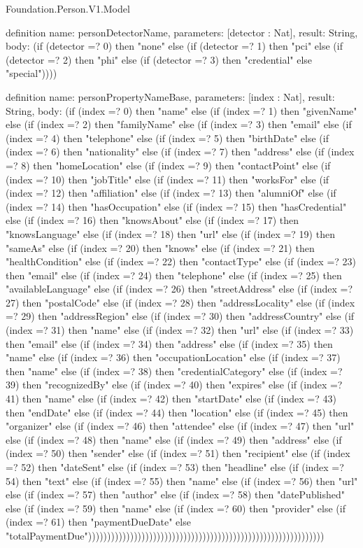 \begin{lexlean}{Foundation.Person.V1.Model}
\begin{semanticmodule}
definition{
  name: personDetectorName,
  parameters: [detector : Nat],
  result: String,
  body: (if (detector =? 0) then "none" else (if (detector =? 1) then "pci" else (if (detector =? 2) then "phi" else (if (detector =? 3) then "credential" else "special"))))
}

definition{
  name: personPropertyNameBase,
  parameters: [index : Nat],
  result: String,
  body: (if (index =? 0) then "name" else (if (index =? 1) then "givenName" else (if (index =? 2) then "familyName" else (if (index =? 3) then "email" else (if (index =? 4) then "telephone" else (if (index =? 5) then "birthDate" else (if (index =? 6) then "nationality" else (if (index =? 7) then "address" else (if (index =? 8) then "homeLocation" else (if (index =? 9) then "contactPoint" else (if (index =? 10) then "jobTitle" else (if (index =? 11) then "worksFor" else (if (index =? 12) then "affiliation" else (if (index =? 13) then "alumniOf" else (if (index =? 14) then "hasOccupation" else (if (index =? 15) then "hasCredential" else (if (index =? 16) then "knowsAbout" else (if (index =? 17) then "knowsLanguage" else (if (index =? 18) then "url" else (if (index =? 19) then "sameAs" else (if (index =? 20) then "knows" else (if (index =? 21) then "healthCondition" else (if (index =? 22) then "contactType" else (if (index =? 23) then "email" else (if (index =? 24) then "telephone" else (if (index =? 25) then "availableLanguage" else (if (index =? 26) then "streetAddress" else (if (index =? 27) then "postalCode" else (if (index =? 28) then "addressLocality" else (if (index =? 29) then "addressRegion" else (if (index =? 30) then "addressCountry" else (if (index =? 31) then "name" else (if (index =? 32) then "url" else (if (index =? 33) then "email" else (if (index =? 34) then "address" else (if (index =? 35) then "name" else (if (index =? 36) then "occupationLocation" else (if (index =? 37) then "name" else (if (index =? 38) then "credentialCategory" else (if (index =? 39) then "recognizedBy" else (if (index =? 40) then "expires" else (if (index =? 41) then "name" else (if (index =? 42) then "startDate" else (if (index =? 43) then "endDate" else (if (index =? 44) then "location" else (if (index =? 45) then "organizer" else (if (index =? 46) then "attendee" else (if (index =? 47) then "url" else (if (index =? 48) then "name" else (if (index =? 49) then "address" else (if (index =? 50) then "sender" else (if (index =? 51) then "recipient" else (if (index =? 52) then "dateSent" else (if (index =? 53) then "headline" else (if (index =? 54) then "text" else (if (index =? 55) then "name" else (if (index =? 56) then "url" else (if (index =? 57) then "author" else (if (index =? 58) then "datePublished" else (if (index =? 59) then "name" else (if (index =? 60) then "provider" else (if (index =? 61) then "paymentDueDate" else "totalPaymentDue"))))))))))))))))))))))))))))))))))))))))))))))))))))))))))))))
}


\end{semanticmodule}
\end{lexlean}
